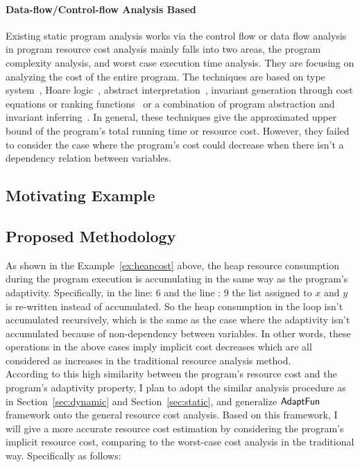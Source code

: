 \paragraph*{Data-flow/Control-flow Analysis Based}
Existing static program analysis works via the control flow or data flow analysis 
in program resource cost analysis 
mainly falls into two areas, the program complexity analysis, and worst case execution time analysis. 
They are focusing on analyzing the cost of the entire program. 
The techniques are based on
type system~\cite{CicekBG0H17, RajaniG0021}, Hoare logic~\cite{CarbonneauxHS15}, abstract interpretation~\cite{GustafssonEL05, HumenbergerJK18},
invariant generation through cost equations or ranking functions~\cite{BrockschmidtEFFG16,AlbertAGP08,AliasDFG10,Flores-MontoyaH14}
or a combination of program abstraction and invariant inferring~\cite{GulwaniZ10, SinnZV17, GulwaniJK09}.
In general, these techniques give the approximated upper bound of the program's total running time or resource cost.
However, they failed to consider the case where the program's cost could decrease when there isn't a dependency relation between variables.

\subsection{Motivating Example}
\label{subsubsec:furthers-cost-example}

\subsection{Proposed Methodology}
\label{subsubsec:furthers-cost-methodology}
As shown in the Example~\ref{ex:heapcost} above, the heap resource consumption during the program 
execution is accumulating in the same way as the program's adaptivity. 
Specifically, in the line: 6 and the line : 9
the list assigned to $x$ and $y$ is re-written instead of accumulated.
So the heap consumption in the loop isn't accumulated recursively, which is 
the same as the case where the adaptivity isn't accumulated because of non-dependency between variables.
In other words, these operations in the above cases imply implicit cost decreases 
which are all considered as increases in the traditional resource analysis 
method.
\\
According to this high similarity between the program's resource cost and the 
program's adaptivity property, I plan to adopt the similar analysis procedure as in Section~\ref{sec:dynamic} and 
Section~\ref{sec:static},
and generalize 
$\textsf{AdaptFun}$ framework onto the general resource cost analysis. 
Based on this framework,
I will give
a more accurate resource cost estimation by considering the program's implicit resource cost, comparing 
to the worst-case cost analysis in the traditional way. Specifically as follows:
